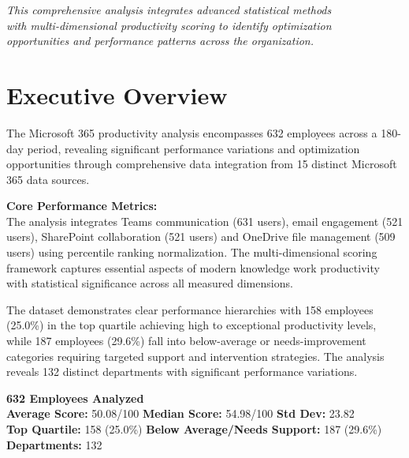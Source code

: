 \documentclass[12pt,a4paper]{article}
\begin{document}
\begin{titlepage}
    \vspace{0.8cm}
    
    {\fontsize{11}{14}\selectfont\color{mediumGray}\textit{
    This comprehensive analysis integrates advanced statistical methods\\
    with multi-dimensional productivity scoring to identify optimization\\
    opportunities and performance patterns across the organization.
    }}
    
\end{titlepage}

\newpage

\section{Executive Overview}

The Microsoft 365 productivity analysis encompasses 632 employees across a 180-day period, revealing significant performance variations and optimization opportunities through comprehensive data integration from 15 distinct Microsoft 365 data sources.

\begin{highlightbox}
\textbf{\faChartLine \quad Core Performance Metrics:}\\[0.5em]
The analysis integrates Teams communication (631 users), email engagement (521 users), SharePoint collaboration (521 users) and OneDrive file management (509 users) using percentile ranking normalization. The multi-dimensional scoring framework captures essential aspects of modern knowledge work productivity with statistical significance across all measured dimensions.
\end{highlightbox}

The dataset demonstrates clear performance hierarchies with 158 employees (25.0\%) in the top quartile achieving high to exceptional productivity levels, while 187 employees (29.6\%) fall into below-average or needs-improvement categories requiring targeted support and intervention strategies. The analysis reveals 132 distinct departments with significant performance variations.

\begin{statsbox}
\begin{center}
\Large\color{primaryGold}
\textbf{632 Employees Analyzed}\\
\vspace{0.6em}
\normalsize\color{darkGray}
\textbf{Average Score:} 50.08/100 \quad \textbf{Median Score:} 54.98/100 \quad \textbf{Std Dev:} 23.82\\[0.4em]
\textbf{Top Quartile:} 158 (25.0\%) \quad \textbf{Below Average/Needs Support:} 187 (29.6\%) \quad \textbf{Departments:} 132
\end{center}
\end{statsbox}
\end{document}
